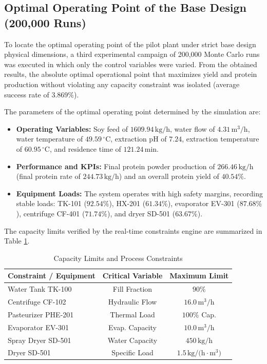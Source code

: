 \documentclass[10pt,letterpaper,twocolumn]{article}
\begin{document}
\subsection{Optimal Operating Point of the Base Design (200,000 Runs)}

To locate the optimal operating point of the pilot plant under strict base design physical dimensions, a third experimental campaign of 200,000 Monte Carlo runs was executed in which only the control variables were varied. From the obtained results, the absolute optimal operational point that maximizes yield and protein production without violating any capacity constraint was isolated (average success rate of $3.869\%$).

The parameters of the optimal operating point determined by the simulation are:
\begin{itemize}
    \item \textbf{Operating Variables:} Soy feed of $1609.94\,\text{kg/h}$, water flow of $4.31\,\text{m}^3/\text{h}$, water temperature of $49.59\,^\circ\text{C}$, extraction pH of $7.24$, extraction temperature of $60.95\,^\circ\text{C}$, and residence time of $121.24\,\text{min}$.
    \item \textbf{Performance and KPIs:} Final protein powder production of $266.46\,\text{kg/h}$ (final protein rate of $244.73\,\text{kg/h}$) and an overall protein yield of $40.54\%$.
    \item \textbf{Equipment Loads:} The system operates with high safety margins, recording stable loads: TK-101 ($92.54\%$), HX-201 ($61.34\%$), evaporator EV-301 ($87.68\%$), centrifuge CF-401 ($71.74\%$), and dryer SD-501 ($63.67\%$).
\end{itemize}

The capacity limits verified by the real-time constraints engine are summarized in Table \ref{tab:restrictions}.

\begin{table}[t]
\centering
\caption{Capacity Limits and Process Constraints}
\label{tab:restrictions}
\begin{tabular}{lcc}
\toprule
Constraint / Equipment & Critical Variable & Maximum Limit \\
\midrule
Water Tank TK-100 & Fill Fraction & $90\%$ \\
Centrifuge CF-102 & Hydraulic Flow & $16.0\,\text{m}^3/\text{h}$ \\
Pasteurizer PHE-201 & Thermal Load & $100\%$ Cap. \\
Evaporator EV-301 & Evap. Capacity & $10.0\,\text{m}^3/\text{h}$ \\
Spray Dryer SD-501 & Water Capacity & $450\,\text{kg/h}$ \\
Dryer SD-501 & Specific Load & $1.5\,\text{kg/(h}\cdot\text{m}^3)$ \\
\bottomrule
\end{tabular}
\end{table}
\end{document}
